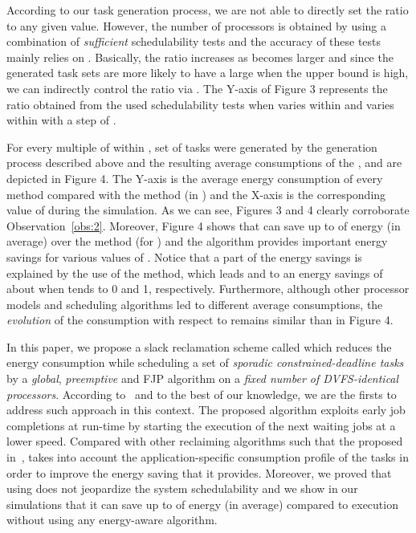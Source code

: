 \documentclass[times, 10pt,twocolumn]{article}
\begin{document}
According to our task generation process, we are not able to directly set the ratio  to any given value. However, the number  of processors is obtained by using a combination of \emph{sufficient} schedulability tests and the accuracy of these tests mainly relies on . Basically, the ratio  increases as  becomes larger and since the generated task sets are more likely to have a large  when the upper bound  is high, we can indirectly control the ratio  via . The Y-axis of Figure 3 represents the ratio  obtained from the used schedulability tests when  varies within  and  varies within  with a step of . 

For every  multiple of  within ,  set of tasks were generated by the generation process described above and the resulting average consumptions of the ,  and  are depicted in Figure 4. The Y-axis is the average energy consumption of every method compared with the  method (in ) and the X-axis is the corresponding value of  during the simulation. As we can see, Figures 3 and 4 clearly corroborate Observation~\ref{obs:2}. Moreover, Figure 4 shows that  can save up to  of energy (in average) over the  method (for ) and the algorithm  provides important energy savings for various values of . Notice that a part of the energy savings is explained by the use of the  method, which leads  and  to an energy savings of about  when  tends to 0 and 1, respectively. Furthermore, although other processor models and scheduling algorithms led to different average consumptions, the \emph{evolution} of the consumption with respect to  remains similar than in Figure 4.

\label{sec:conclusion}

In this paper, we propose a slack reclamation scheme called  which reduces the energy consumption while scheduling a set of \emph{sporadic constrained-deadline tasks} by a \emph{global}, \emph{preemptive} and FJP algorithm on a \emph{fixed number of DVFS-identical processors}. According to~\cite{Chen:07} and to the best of our knowledge, we are the firsts to address such approach in this context. The proposed algorithm  exploits early job completions at run-time by starting the execution of the next waiting jobs at a lower speed. Compared with other reclaiming algorithms such that the  proposed in~\cite{AyMeMoMe:04},  takes into account the application-specific consumption profile of the tasks in order to improve the energy saving that it provides. Moreover, we proved that using  does not jeopardize the system schedulability and we show in our simulations that it can save up to  of energy (in average) compared to execution without using any energy-aware algorithm. 
\end{document}
